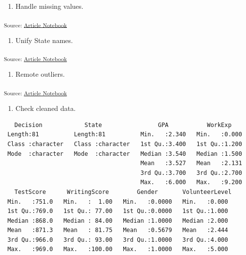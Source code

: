 \documentclass[
  letterpaper,
  DIV=11,
  numbers=noendperiod]{scrartcl}
\providecommand{\tightlist}{%
  \setlength{\itemsep}{0pt}\setlength{\parskip}{0pt}}\usepackage{longtable,booktabs,array}
\begin{document}
\begin{enumerate}
\def\labelenumi{\arabic{enumi}.}
\setcounter{enumi}{2}
\tightlist
\item
  Handle missing values.
\end{enumerate}

\textsubscript{Source:
\href{https://verkyyi.github.io/5900-hw1/index.qmd.html}{Article
Notebook}}

\begin{enumerate}
\def\labelenumi{\arabic{enumi}.}
\setcounter{enumi}{3}
\tightlist
\item
  Unify State names.
\end{enumerate}

\textsubscript{Source:
\href{https://verkyyi.github.io/5900-hw1/index.qmd.html}{Article
Notebook}}

\begin{enumerate}
\def\labelenumi{\arabic{enumi}.}
\setcounter{enumi}{4}
\tightlist
\item
  Remote outliers.
\end{enumerate}

\textsubscript{Source:
\href{https://verkyyi.github.io/5900-hw1/index.qmd.html}{Article
Notebook}}

\begin{enumerate}
\def\labelenumi{\arabic{enumi}.}
\setcounter{enumi}{5}
\tightlist
\item
  Check cleaned data.
\end{enumerate}

\begin{verbatim}
   Decision            State                GPA           WorkExp     
 Length:81          Length:81          Min.   :2.340   Min.   :0.000  
 Class :character   Class :character   1st Qu.:3.400   1st Qu.:1.200  
 Mode  :character   Mode  :character   Median :3.540   Median :1.500  
                                       Mean   :3.527   Mean   :2.131  
                                       3rd Qu.:3.700   3rd Qu.:2.700  
                                       Max.   :6.000   Max.   :9.200  
   TestScore      WritingScore        Gender       VolunteerLevel 
 Min.   :751.0   Min.   :  1.00   Min.   :0.0000   Min.   :0.000  
 1st Qu.:769.0   1st Qu.: 77.00   1st Qu.:0.0000   1st Qu.:1.000  
 Median :868.0   Median : 84.00   Median :1.0000   Median :2.000  
 Mean   :871.3   Mean   : 81.75   Mean   :0.5679   Mean   :2.444  
 3rd Qu.:966.0   3rd Qu.: 93.00   3rd Qu.:1.0000   3rd Qu.:4.000  
 Max.   :969.0   Max.   :100.00   Max.   :1.0000   Max.   :5.000  
\end{verbatim}
\end{document}

